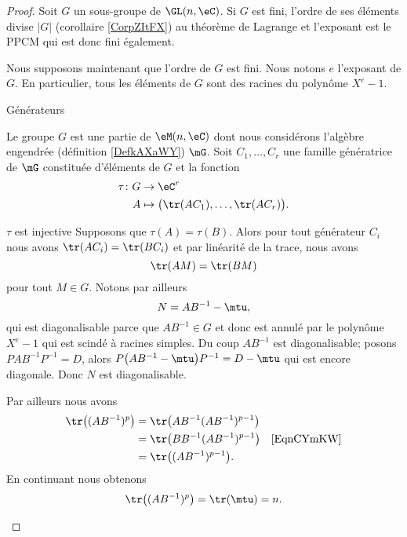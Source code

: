 \begin{proof}
    Soit \( G\) un sous-groupe de \( \GL(n,\eC)\). Si \( G\) est fini, l'ordre de ses éléments divise \( | G |\) (corollaire \ref{CorpZItFX}) au théorème de Lagrange et l'exposant est le PPCM qui est donc fini également.

    Nous supposons maintenant que l'ordre de \( G\) est fini. Nous notons \( e\) l'exposant de \( G\). En particulier, tous les éléments de \( G\) sont des racines du polynôme \( X^e-1\).
    
    \begin{subproof}
        \item[Générateurs]

            Le groupe \( G\) est une partie de \( \eM(n,\eC)\) dont nous considérons l'algèbre engendrée (définition \ref{DefkAXaWY}) \( \mG\). Soit \( C_1,\ldots, C_r\) une famille génératrice de \( \mG\) constituée d'éléments de \( G\) et la fonction
            \begin{equation}
                \begin{aligned}
                    \tau\colon G&\to \eC^r \\
                    A&\mapsto \big( \tr(AC_1),\ldots, \tr(AC_r) \big). 
                \end{aligned}
            \end{equation}

        \item[\( \tau\) est injective] Supposons que \( \tau(A)=\tau(B)\). Alors pour tout générateur \( C_i\) nous avons \( \tr(AC_i)=\tr(BC_i)\) et par linéarité de la trace, nous avons
            \begin{equation}    \label{EqnCYmKW}
                \tr(AM)=\tr(BM)
            \end{equation}
            pour tout \( M\in G\). Notons par ailleurs
            \begin{equation}
                N=AB^{-1}-\mtu,
            \end{equation}
            qui est diagonalisable parce que \( AB^{-1}\in G\) et donc est annulé par le polynôme \( X^e-1\) qui est scindé à racines simples. Du coup \( AB^{-1}\) est diagonalisable; posons \( PAB^{-1}P^{-1}=D\), alors \( P\big( AB^{-1}-\mtu \big)P^{-1}=D-\mtu\) qui est encore diagonale. Donc \( N\) est diagonalisable.

            Par ailleurs nous avons
            \begin{subequations}
                \begin{align}
                    \tr\big( (AB^{-1})^p \big)&=\tr\big( AB^{-1}(AB^{-1})^{p-1} \big)\\
                    &=\tr\big( BB^{-1}(AB^{-1})^{p-1} \big) &\text{\eqref{EqnCYmKW}}\\
                    &=\tr\big( (AB^{-1})^{p-1} \big).
                \end{align}
            \end{subequations}
            En continuant nous obtenons
            \begin{equation}
                \tr\big(  (AB^{-1})^p \big)=\tr(\mtu)=n.
            \end{equation}
            

\end{subproof}
\end{proof}
